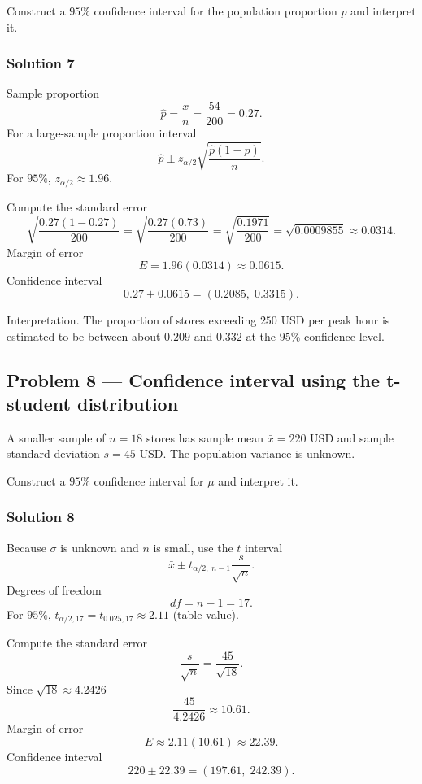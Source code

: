 Construct a $95\%$ confidence interval for the population proportion $p$ and interpret it.

\subsubsection*{Solution 7}

Sample proportion
\[
\hat{p} = \frac{x}{n} = \frac{54}{200} = 0.27.
\]
For a large-sample proportion interval
\[
\hat{p} \pm z_{\alpha/2}\sqrt{\frac{\hat{p}(1-\hat{p})}{n}}.
\]
For $95\%$, $z_{\alpha/2} \approx 1.96$.

Compute the standard error
\[
\sqrt{\frac{0.27(1-0.27)}{200}}
= \sqrt{\frac{0.27(0.73)}{200}}
= \sqrt{\frac{0.1971}{200}}
= \sqrt{0.0009855}
\approx 0.0314.
\]
Margin of error
\[
E = 1.96(0.0314) \approx 0.0615.
\]
Confidence interval
\[
0.27 \pm 0.0615 = (0.2085,\;0.3315).
\]

Interpretation. The proportion of stores exceeding $250$ USD per peak hour is estimated to be between about $0.209$ and $0.332$ at the $95\%$ confidence level.


\subsection*{Problem 8 — Confidence interval using the t-student distribution}

A smaller sample of $n = 18$ stores has sample mean $\bar{x} = 220$ USD and sample standard deviation $s = 45$ USD. The population variance is unknown.

Construct a $95\%$ confidence interval for $\mu$ and interpret it.

\subsubsection*{Solution 8}

Because $\sigma$ is unknown and $n$ is small, use the $t$ interval
\[
\bar{x} \pm t_{\alpha/2,\;n-1}\frac{s}{\sqrt{n}}.
\]
Degrees of freedom
\[
df = n-1 = 17.
\]
For $95\%$, $t_{\alpha/2,17} = t_{0.025,17} \approx 2.11$ (table value).

Compute the standard error
\[
\frac{s}{\sqrt{n}} = \frac{45}{\sqrt{18}}.
\]
Since $\sqrt{18} \approx 4.2426$
\[
\frac{45}{4.2426} \approx 10.61.
\]
Margin of error
\[
E \approx 2.11(10.61) \approx 22.39.
\]
Confidence interval
\[
220 \pm 22.39 = (197.61,\;242.39).
\]

